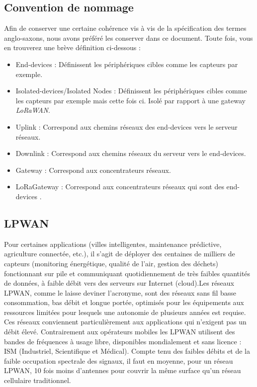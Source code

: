\documentclass[11pt]{article}
\begin{document}
\subsection{Convention de nommage }
Afin de conserver une certaine cohérence vis à vis de la spécification des termes anglo-saxons, nous avons préféré les conserver dans ce document. Toute fois, vous en trouverez une brève définition ci-dessous : 
\begin{itemize}
\item End-devices : Définissent les périphériques cibles comme les capteurs par exemple.
\item Isolated-devices/Isolated Nodes : Définissent les périphériques cibles comme les capteurs par exemple  mais cette fois ci. Isolé par rapport à une gateway  \textit{LoRaWAN}.
\item Uplink : Correspond aux chemins réseaux des end-devices vers le serveur réseaux. 
\item Downlink : Correspond aux chemins réseaux du serveur vers le end-devices. 
\item Gateway : Correspond aux concentrateurs réseaux. 
\item LoRaGateway : Correspond aux concentrateurs réseaux qui sont des end-devices . 
\end{itemize}



\subsection{LPWAN}
Pour certaines applications (villes intelligentes, maintenance prédictive, agriculture connectée, etc.), il s'agit de déployer des centaines de milliers de capteurs (monitoring énergétique, qualité de l'air, gestion des déchets) fonctionnant sur pile et communiquant quotidiennement de très faibles quantités de données, à faible débit vers des serveurs sur Internet (cloud).Les réseaux LPWAN, comme le laisse deviner l'acronyme, sont des réseaux sans fil basse consommation, bas débit et longue portée, optimisés pour les équipements aux ressources limitées pour lesquels une autonomie de plusieurs années est requise. Ces réseaux conviennent particulièrement aux applications qui n'exigent pas un débit élevé.
Contrairement aux opérateurs mobiles les LPWAN utilisent des bandes de fréquences à usage libre, disponibles mondialement et sans licence : ISM (Industriel, Scientifique et Médical). Compte tenu des faibles débits et de la faible occupation spectrale des signaux, il faut en moyenne, pour un réseau LPWAN, 10 fois moins d'antennes pour couvrir la même surface qu'un réseau cellulaire traditionnel.
\end{document}
